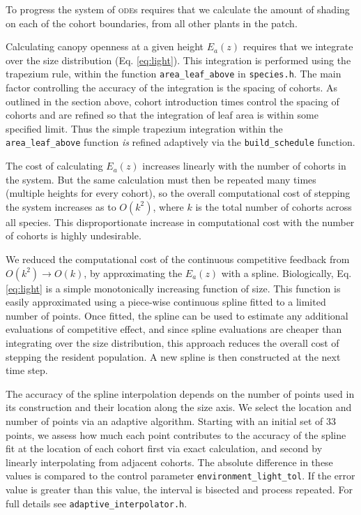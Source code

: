 \documentclass[10pt,twoside]{article}
\begin{document}
To progress the system of \textsc{ode}s requires that we calculate the amount of
shading on each of the cohort boundaries, from all other plants in the
patch.

Calculating canopy openness at a given height \(E_a(z)\) requires that
we integrate over the size distribution (Eq. \ref{eq:light}). This
integration is performed using the trapezium rule, within the function
\texttt{area\_leaf\_above} in \texttt{species.h}. The main factor
controlling the accuracy of the integration is the spacing of cohorts.
As outlined in the section above, cohort introduction times control the
spacing of cohorts and are refined so that the integration of leaf area
is within some specified limit. Thus the simple trapezium integration
within the \texttt{area\_leaf\_above} function \emph{is} refined
adaptively via the \texttt{build\_schedule} function.

The cost of calculating \(E_a(z)\) increases linearly with the number of
cohorts in the system. But the same calculation must then be repeated
many times (multiple heights for every cohort), so the overall computational cost
of stepping the system increases as to \(O(k^2)\), where \(k\) is the
total number of cohorts across all species. This disproportionate
increase in computational cost with the number of cohorts is highly undesirable.

We reduced the computational cost of the continuous competitive feedback
from \(O(k^2) \rightarrow O(k)\), by approximating the \(E_a(z)\) with a
spline. Biologically, Eq. \ref{eq:light} is a simple monotonically
increasing function of size. This function is easily
approximated using a piece-wise continuous spline fitted to a limited
number of points. Once fitted, the spline can be used to estimate any
additional evaluations of competitive effect, and since spline
evaluations are cheaper than integrating over the size distribution,
this approach reduces the overall cost of stepping the resident
population. A new spline is then constructed at the next time step.

The accuracy of the spline interpolation depends on the number of points
used in its construction and their location along the size axis. We
select the location and number of points via an adaptive algorithm.
Starting with an initial set of 33 points, we assess how much each point
contributes to the accuracy of the spline fit at the location of each
cohort first via exact calculation, and second by linearly interpolating
from adjacent cohorts. The absolute difference in these values is
compared to the control parameter \texttt{environment\_light\_tol}. If
the error value is greater than this value, the interval is bisected and
process repeated. For full details see
\texttt{adaptive\_interpolator.h}.
\end{document}
